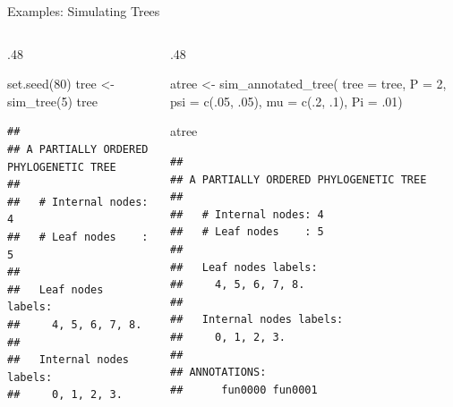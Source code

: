 \documentclass[9pt,ignorenonframetext,]{beamer}
\newenvironment{Shaded}{\begin{snugshade}}{\end{snugshade}}
\newcommand{\KeywordTok}[1]{\textcolor[rgb]{0.94,0.87,0.69}{#1}}
\newcommand{\DataTypeTok}[1]{\textcolor[rgb]{0.87,0.87,0.75}{#1}}
\newcommand{\DecValTok}[1]{\textcolor[rgb]{0.86,0.86,0.80}{#1}}
\newcommand{\StringTok}[1]{\textcolor[rgb]{0.80,0.58,0.58}{#1}}
\newcommand{\NormalTok}[1]{\textcolor[rgb]{0.80,0.80,0.80}{#1}}
\def\begincols{\begin{columns}[T]}
\def\begincol{\begin{column}[T]}
\def\endcol{\end{column}}
\def\endcols{\end{columns}}
\begin{document}
\begin{frame}[fragile,t]{Examples: Simulating Trees}

\begincols

\begincol{.48\textwidth}

\footnotesize

\begin{Shaded}
\begin{Highlighting}[]
\KeywordTok{set.seed}\NormalTok{(}\DecValTok{80}\NormalTok{)}
\NormalTok{tree <-}\StringTok{ }\KeywordTok{sim_tree}\NormalTok{(}\DecValTok{5}\NormalTok{)}
\NormalTok{tree}
\end{Highlighting}
\end{Shaded}

\begin{verbatim}
## 
## A PARTIALLY ORDERED PHYLOGENETIC TREE
## 
##   # Internal nodes: 4
##   # Leaf nodes    : 5
## 
##   Leaf nodes labels: 
##     4, 5, 6, 7, 8.
## 
##   Internal nodes labels:
##     0, 1, 2, 3.
\end{verbatim}

\normalsize

\endcol

\begincol{.48\textwidth}

\footnotesize

\begin{Shaded}
\begin{Highlighting}[]
\NormalTok{atree <-}\StringTok{ }\KeywordTok{sim_annotated_tree}\NormalTok{(}
  \DataTypeTok{tree =}\NormalTok{ tree, }\DataTypeTok{P =} \DecValTok{2}\NormalTok{,}
  \DataTypeTok{psi  =} \KeywordTok{c}\NormalTok{(.}\DecValTok{05}\NormalTok{, .}\DecValTok{05}\NormalTok{),}
  \DataTypeTok{mu   =} \KeywordTok{c}\NormalTok{(.}\DecValTok{2}\NormalTok{, .}\DecValTok{1}\NormalTok{),}
  \DataTypeTok{Pi   =}\NormalTok{ .}\DecValTok{01}\NormalTok{)}

\NormalTok{atree}
\end{Highlighting}
\end{Shaded}

\begin{verbatim}
## 
## A PARTIALLY ORDERED PHYLOGENETIC TREE
## 
##   # Internal nodes: 4
##   # Leaf nodes    : 5
## 
##   Leaf nodes labels: 
##     4, 5, 6, 7, 8.
## 
##   Internal nodes labels:
##     0, 1, 2, 3.
## 
## ANNOTATIONS:
##      fun0000 fun0001
\end{verbatim}

\normalsize

\endcol

\endcols

\end{frame}
\end{document}
